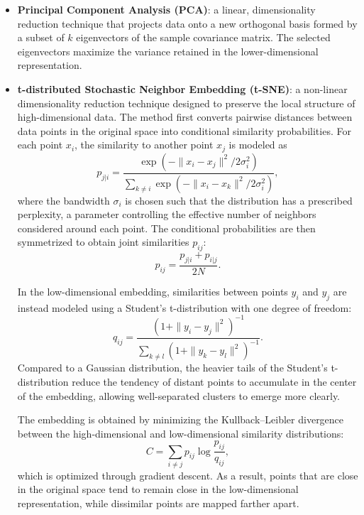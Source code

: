 \documentclass[prl,twocolumn]{revtex4-1}
\begin{document}
\begin{itemize}
    \item \textbf{Principal Component Analysis (PCA)}:
    a linear, dimensionality reduction technique that projects data onto a new orthogonal basis formed by a subset of $k$ eigenvectors of the sample covariance matrix.
    The selected eigenvectors maximize the variance retained in the lower-dimensional representation.

    \item \textbf{t-distributed Stochastic Neighbor Embedding (t-SNE)}:
    a non-linear dimensionality reduction technique designed to preserve the local structure of high-dimensional data.
    The method first converts pairwise distances between data points in the original space into conditional similarity probabilities.
    For each point $x_i$, the similarity to another point $x_j$ is modeled as
    \begin{equation}
        p_{j|i} = \frac{\exp \left( -\|x_i - x_j\|^2 / 2\sigma_i^2 \right)}
        {\sum_{k \neq i} \exp \left( -\|x_i - x_k\|^2 / 2\sigma_i^2 \right)},
    \end{equation}
    where the bandwidth $\sigma_i$ is chosen such that the distribution has a prescribed perplexity, a parameter controlling the effective number of neighbors considered around each point.
    The conditional probabilities are then symmetrized to obtain joint similarities $p_{ij}$:
    \begin{equation}
        p_{ij} = \frac{p_{j|i} + p_{i|j}}{2N}.
    \end{equation}

    In the low-dimensional embedding, similarities between points $y_i$ and $y_j$ are instead modeled using a Student's t-distribution with one degree of freedom:
    \begin{equation}
        q_{ij} =
        \frac{\left(1+\|y_i-y_j\|^2\right)^{-1}}
        {\sum_{k \neq l}\left(1+\|y_k-y_l\|^2\right)^{-1}}.
    \end{equation}
    Compared to a Gaussian distribution, the heavier tails of the Student's t-distribution reduce the tendency of distant points to accumulate in the center of the embedding, allowing well-separated clusters to emerge more clearly.

    The embedding is obtained by minimizing the Kullback--Leibler divergence between the high-dimensional and low-dimensional similarity distributions:
    \begin{equation}
        C = \sum_{i \neq j} p_{ij}\log\frac{p_{ij}}{q_{ij}},
    \end{equation}
    which is optimized through gradient descent.
    As a result, points that are close in the original space tend to remain close in the low-dimensional representation, while dissimilar points are mapped farther apart.


\end{itemize}
\end{document}

